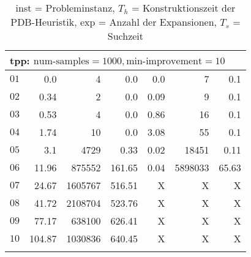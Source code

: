 \begin{longtable}{|c||r|r|r||r|r|r|}
\multicolumn{7}{|l|}{tpp: $\text{num-samples}=1000,\text{min-improvement}=10$}\\\hline
$01$ & 0.0 & 4 & 0.0 & 0.0 & 7 & 0.1 \\\hline
$02$ & 0.34 & 2 & 0.0 & 0.09 & 9 & 0.1 \\\hline
$03$ & 0.53 & 4 & 0.0 & 0.86 & 16 & 0.1 \\\hline
$04$ & 1.74 & 10 & 0.0 & 3.08 & 55 & 0.1 \\\hline
$05$ & 3.1 & 4729 & 0.33 & 0.02 & 18451 & 0.11 \\\hline
$06$ & 11.96 & 875552 & 161.65 & 0.04 & 5898033 & 65.63 \\\hline
$07$ & 24.67 & 1605767 & 516.51 & X & X & X \\\hline
$08$ & 41.72 & 2108704 & 523.76 & X & X & X \\\hline
$09$ & 77.17 & 638100 & 626.41 & X & X & X \\\hline
$10$ & 104.87 & 1030836 & 640.45 & X & X & X \\\hline

\caption{inst = Probleminstanz, $T_h$ = Konstruktionszeit der PDB-Heuristik, exp = Anzahl der Expansionen, $T_s$ = Suchzeit}
\end{longtable}